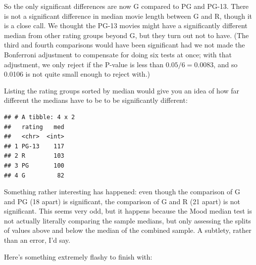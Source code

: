 \documentclass[]{tufte-book}
\newenvironment{Shaded}{}{}
\newcommand{\DataTypeTok}[1]{\textcolor[rgb]{0.56,0.13,0.00}{#1}}
\newcommand{\KeywordTok}[1]{\textcolor[rgb]{0.00,0.44,0.13}{\textbf{#1}}}
\newcommand{\NormalTok}[1]{#1}
\newcommand{\OperatorTok}[1]{\textcolor[rgb]{0.40,0.40,0.40}{#1}}
\newcommand{\StringTok}[1]{\textcolor[rgb]{0.25,0.44,0.63}{#1}}
\theoremstyle{definition}
\theoremstyle{definition}
\theoremstyle{definition}
\theoremstyle{remark}
\begin{document}
So the only significant differences are now G compared to PG and PG-13.
There is not a significant difference in median movie length between G
and R, though it is a close call. We thought the PG-13 movies might have
a significantly different median from other rating groups beyond G, but
they turn out not to have. (The third and fourth comparisons would have
been significant had we not made the Bonferroni adjustment to compensate
for doing six tests at once; with that adjustment, we only reject if the
P-value is less than \(0.05/6=0.0083\), and so 0.0106 is not quite small
enough to reject with.)

Listing the rating groups sorted by median would give you an idea of how
far different the medians have to be to be significantly different:

\begin{Shaded}
\end{Shaded}

\begin{verbatim}
## # A tibble: 4 x 2
##   rating   med
##   <chr>  <int>
## 1 PG-13    117
## 2 R        103
## 3 PG       100
## 4 G         82
\end{verbatim}

Something rather interesting has happened: even though the comparison of
G and PG (18 apart) is significant, the comparison of G and R (21 apart)
is not significant. This seems very odd, but it happens because the Mood
median test is not actually literally comparing the sample medians, but
only assessing the splits of values above and below the median of the
combined sample. A subtlety, rather than an error, I'd say.

Here's something extremely flashy to finish with:
\end{document}
